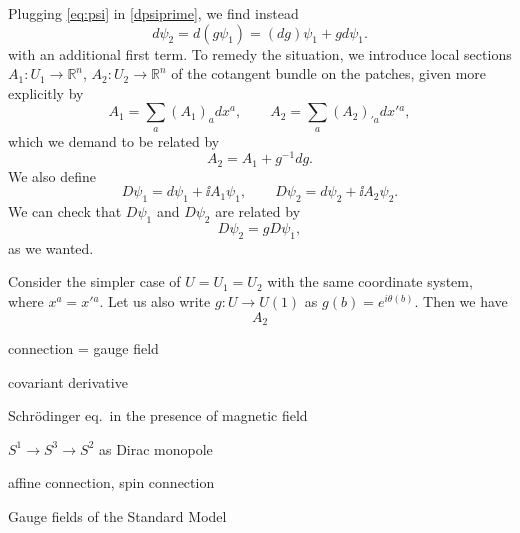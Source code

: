 \documentclass[12pt]{article}
\numberwithin{equation}{section}
\numberwithin{figure}{section}
\theoremstyle{remark}
\def\bR{\mathbb{R}}
\begin{document}
Plugging \eqref{eq:psi} in \eqref{dpsiprime}, we find instead \begin{equation}
d\psi_2 = d (g\psi_1) = (dg ) \psi_1 + g d\psi_1.
\end{equation} with an additional first term.
To remedy the situation,
we introduce local sections 
$A_1: U_1\to \bR^n$, $A_2:U_2\to \bR^n$ of the cotangent bundle on the patches,
given more explicitly by \begin{equation}
  A_1 = \sum_a (A_1)_a dx^a, \qquad A_2 = \sum_a (A_2)_{'a} dx'{}^a,
\end{equation} 
which we demand to be related by \begin{equation}
  A_2 = A_1 + g^{-1} dg.\label{eq:AA}
\end{equation}
We also define \begin{equation}
  D\psi_1 = d\psi_1 + \ii A_1 \psi_1, \qquad D\psi_2 = d\psi_2 + \ii A_2 \psi_2.
\end{equation}
We can check that $D\psi_1$ and $D\psi_2$ are related by \begin{equation}
  D\psi_2 = g D\psi_1,
\end{equation} as we wanted.

Consider the simpler case of $U=U_1=U_2$ with the same coordinate system,
where $x^a=x'{}^a$. 
Let us also write $g: U\to U(1)$ as $g(b)=e^{i\theta(b)}$.
Then we have \begin{equation}
A_2 
\end{equation}
\begin{definition}
connection = gauge field
\end{definition}

\begin{definition}
covariant derivative
\end{definition}

\begin{example}
Schr\"odinger eq.~in the presence of magnetic field
\end{example}

\begin{example}
$S^1\to S^3\to S^2$ as Dirac monopole
\end{example}

\begin{example}
affine connection, spin connection
\end{example}
 
\begin{example}
Gauge fields of the Standard Model
\end{example}
\end{document}
